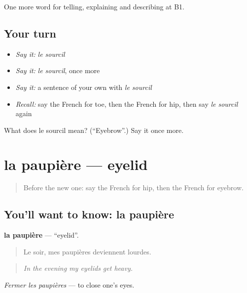 \begin{grammarlens}[title={What you've built}]
One more word for telling, explaining and describing at B1.
\end{grammarlens}

\subsection*{Your turn}
\begin{itemize}
\raggedright
  \item \emph{Say it:} \emph{le sourcil}
  \item \emph{Say it:} \emph{le sourcil}, once more
  \item \emph{Say it:} a sentence of your own with \emph{le sourcil}
  \item \emph{Recall:} say the French for toe, then the French for hip, then say \emph{le sourcil} again
\end{itemize}

\begin{tcolorbox}[breakable,colback=teal!4,colframe=teal!35!black,title={Before you move on}]
What does le sourcil mean? (\textquotedblleft{}Eyebrow\textquotedblright{}.) Say it once more.
\end{tcolorbox}
\section[la paupière]{la paupière — eyelid}

\label{lesson:FR-C478-paupiere}



\begin{quote}
Before the new one: say the French for hip, then the French for eyebrow.
\end{quote}

\subsection*{You'll want to know: la paupière}
\textbf{la paupière} — \textquotedblleft{}eyelid\textquotedblright{}.

\begin{quote}
Le soir, mes paupières deviennent lourdes.
\end{quote}

\begin{quote}
\emph{In the evening my eyelids get heavy.}
\end{quote}

\emph{Fermer les paupières} — to close one's eyes.

